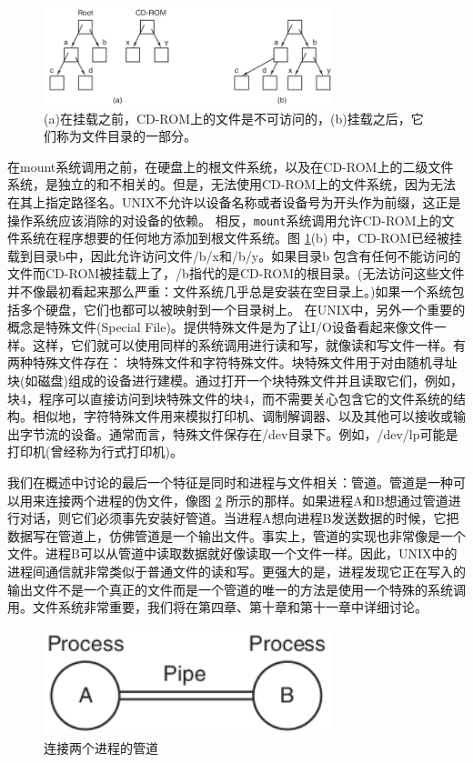 	\begin{figure}[ht]\small
		\centering
		\includegraphics[width=0.75\textwidth]{FIG/1-15.png}
		\caption{(a)在挂载之前，CD-ROM上的文件是不可访问的，(b)挂载之后，它们称为文件目录的一部分。}\label{fig:mounting}
	\end{figure}

	在mount系统调用之前，在硬盘上的根文件系统，以及在CD-ROM上的二级文件系统，是独立的和不相关的。但是，无法使用CD-ROM上的文件系统，因为无法在其上指定路径名。UNIX不允许以设备名称或者设备号为开头作为前缀，这正是操作系统应该消除的对设备的依赖。
	相反，\texttt{mount}系统调用允许CD-ROM上的文件系统在程序想要的任何地方添加到根文件系统。图 \ref{fig:mounting}(b) 中，CD-ROM已经被挂载到目录b中，因此允许访问文件/b/x和/b/y。如果目录b
	包含有任何不能访问的文件而CD-ROM被挂载上了，/b指代的是CD-ROM的根目录。(无法访问这些文件并不像最初看起来那么严重：文件系统几乎总是安装在空目录上。)如果一个系统包括多个硬盘，它们也都可以被映射到一个目录树上。
	在UNIX中，另外一个重要的概念是特殊文件(Special File)。提供特殊文件是为了让I/O设备看起来像文件一样。这样，它们就可以使用同样的系统调用进行读和写，就像读和写文件一样。有两种特殊文件存在：	块特殊文件和字符特殊文件。块特殊文件用于对由随机寻址块(如磁盘)组成的设备进行建模。通过打开一个块特殊文件并且读取它们，例如，块4，程序可以直接访问到块特殊文件的块4，而不需要关心包含它的文件系统的结构。相似地，字符特殊文件用来模拟打印机、调制解调器、以及其他可以接收或输出字节流的设备。通常而言，特殊文件保存在/dev目录下。例如，/dev/lp可能是打印机(曾经称为行式打印机)。
	
	我们在概述中讨论的最后一个特征是同时和进程与文件相关：管道。管道是一种可以用来连接两个进程的伪文件，像图 \ref{fig:pipe} 所示的那样。如果进程A和B想通过管道进行对话，则它们必须事先安装好管道。当进程A想向进程B发送数据的时候，它把数据写在管道上，仿佛管道是一个输出文件。事实上，管道的实现也非常像是一个文件。进程B可以从管道中读取数据就好像读取一个文件一样。因此，UNIX中的进程间通信就非常类似于普通文件的读和写。更强大的是，进程发现它正在写入的输出文件不是一个真正的文件而是一个管道的唯一的方法是使用一个特殊的系统调用。文件系统非常重要，我们将在第四章、第十章和第十一章中详细讨论。

	\begin{figure}[ht]\small
		\centering
		\includegraphics[width=0.75\textwidth]{FIG/1-16.png}
		\caption{连接两个进程的管道}\label{fig:pipe}
	\end{figure}

